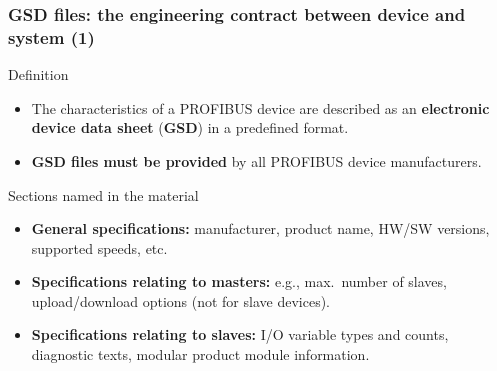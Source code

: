 \begin{frame}
	\frametitle{GSD files: the engineering contract between device and system (1)}
	\justifying
	\begin{block}{Definition}
		\begin{itemize}
			\item The characteristics of a PROFIBUS device are described as an \textbf{electronic device data sheet} (\textbf{GSD}) in a predefined format.
			\item \textbf{GSD files must be provided} by all PROFIBUS device manufacturers.
		\end{itemize}
	\end{block}
	\begin{block}{Sections named in the material}
		\begin{itemize}
			\item \textbf{General specifications:} manufacturer, product name, HW/SW versions, supported speeds, etc.
			\item \textbf{Specifications relating to masters:} e.g., max.\ number of slaves, upload/download options (not for slave devices).
			\item \textbf{Specifications relating to slaves:} I/O variable types and counts, diagnostic texts, modular product module information.
		\end{itemize}
	\end{block}
\end{frame}

